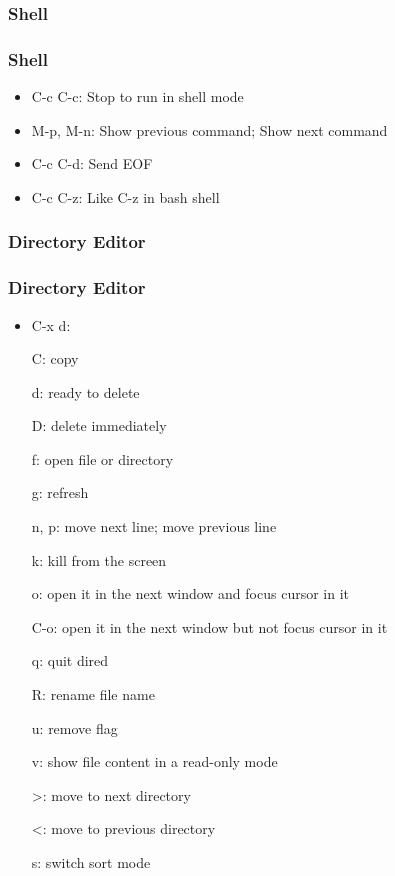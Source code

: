 \subsubsection{Shell}
\begin{frame}
\frametitle{Shell}
    \begin{itemize}
        \item C-c C-c: Stop to run in shell mode
        \item M-p, M-n: Show previous command; Show next command
        \item C-c C-d: Send EOF
        \item C-c C-z: Like C-z in bash shell
    \end{itemize}
\end{frame}
\subsubsection{Directory Editor}
\begin{frame}[allowframebreaks]
\frametitle{Directory Editor}
    \begin{itemize}
        \item C-x d:

  C: copy

  d: ready to delete

  D: delete immediately

  f: open file or directory

  g: refresh

  n, p: move next line; move previous line

  k: kill from the screen

  o: open it in the next window and focus cursor in it

  C-o: open it in the next window but not focus cursor in it

  q: quit dired

  R: rename file name

  u: remove flag

  v: show file content in a read-only mode

  >: move to next directory

  <: move to previous directory

  s: switch sort mode

    \end{itemize}
\end{frame}
